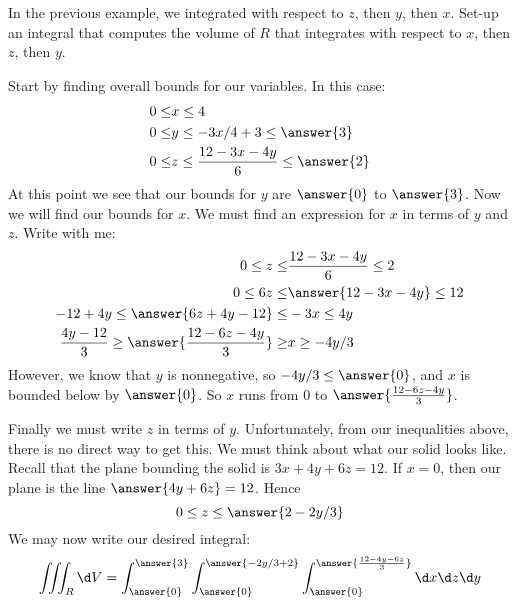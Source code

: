 \documentclass{ximera}
\begin{document}
\begin{question}
  In the previous example, we integrated with respect to $z$, then
  $y$, then $x$. Set-up an integral that computes the volume of $R$
  that integrates with respect to $x$, then $z$, then $y$.
  \begin{prompt}
    Start by finding overall bounds for our variables. In this case:
    \begin{align*}
      0\le &x \le 4\\
      0\le &y \le -3x/4+3 \le \answer{3}\\
      0\le &z \le \frac{12-3x-4y}{6}\le \answer{2}
    \end{align*}
    At this point we see that our bounds for $y$ are $\answer{0}$ to
    $\answer{3}$. Now we will find our bounds for $x$. We must find an
    expression for $x$ in terms of $y$ and $z$. Write with me:
    \begin{align*}
      0\le z \le &\frac{12-3x-4y}{6}\le 2\\
      0\le 6z \le &\answer{12-3x-4y} \le 12\\
      -12+4y\le \answer{6z+4y-12}\le &-3x \le 4y\\
      \frac{4y-12}{3}\ge \answer{\frac{12-6z-4y}{3}}\ge &x \ge -4y/3
    \end{align*}
    However, we know that $y$ is nonnegative, so $-4y/3\le \answer{0}$, and $x$
    is bounded below by $\answer{0}$. So $x$ runs from $0$ to
    $\answer{\frac{12-6z-4y}{3}}$.

    Finally we must write $z$ in terms of $y$. Unfortunately, from our
    inequalities above, there is no direct way to get this. We must
    think about what our solid looks like. Recall that the plane
    bounding the solid is $3x + 4y + 6z = 12$. If $x=0$, then our
    plane is the line $\answer{4y+6z}=12$. Hence
    \[
    0\le z \le \answer{2-2y/3}
    \]
    We may now write our desired integral:
    \[
    \iiint_R \d V = \int_{\answer{0}}^{\answer{3}}\int_{\answer{0}}^{\answer{-2y/3+2}} \int_{\answer{0}}^{\answer{\frac{12-4y-6z}{3}}} \d x \d z \d y
    \]
  \end{prompt}
\end{question}
\end{document}
